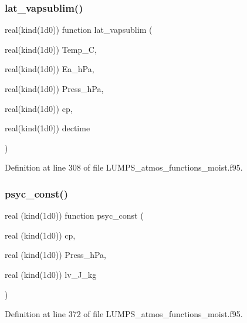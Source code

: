 \subsubsection{\texorpdfstring{lat\+\_\+vapsublim()}{lat\_vapsublim()}}
{\footnotesize\ttfamily real(kind(1d0)) function lat\+\_\+vapsublim (\begin{DoxyParamCaption}\item[{real(kind(1d0))}]{Temp\+\_\+C,  }\item[{real(kind(1d0))}]{Ea\+\_\+h\+Pa,  }\item[{real(kind(1d0))}]{Press\+\_\+h\+Pa,  }\item[{real(kind(1d0))}]{cp,  }\item[{real(kind(1d0))}]{dectime }\end{DoxyParamCaption})}



Definition at line 308 of file L\+U\+M\+P\+S\+\_\+atmos\+\_\+functions\+\_\+moist.\+f95.

\mbox{\label{_l_u_m_p_s__atmos__functions__moist_8f95_aca3cbb873a6638e6d630d35e0133d1dc}} 
\subsubsection{\texorpdfstring{psyc\+\_\+const()}{psyc\_const()}}
{\footnotesize\ttfamily real (kind(1d0)) function psyc\+\_\+const (\begin{DoxyParamCaption}\item[{real (kind(1d0))}]{cp,  }\item[{real (kind(1d0))}]{Press\+\_\+h\+Pa,  }\item[{real (kind(1d0))}]{lv\+\_\+\+J\+\_\+kg }\end{DoxyParamCaption})}



Definition at line 372 of file L\+U\+M\+P\+S\+\_\+atmos\+\_\+functions\+\_\+moist.\+f95.

